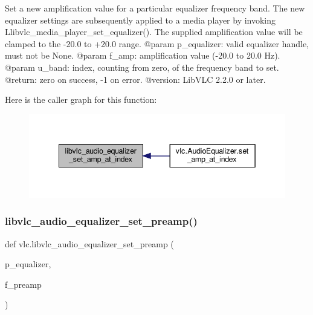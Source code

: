 \begin{DoxyVerb}Set a new amplification value for a particular equalizer frequency band.
The new equalizer settings are subsequently applied to a media player by invoking
L{libvlc_media_player_set_equalizer}().
The supplied amplification value will be clamped to the -20.0 to +20.0 range.
@param p_equalizer: valid equalizer handle, must not be None.
@param f_amp: amplification value (-20.0 to 20.0 Hz).
@param u_band: index, counting from zero, of the frequency band to set.
@return: zero on success, -1 on error.
@version: LibVLC 2.2.0 or later.
\end{DoxyVerb}
 Here is the caller graph for this function\+:
\nopagebreak
\begin{figure}[H]
\begin{center}
\leavevmode
\includegraphics[width=342pt]{namespacevlc_afa112c9fa2e01582526543f4cc824132_icgraph}
\end{center}
\end{figure}
\mbox{\label{namespacevlc_a10afe2e2760d5e0929afd7544bd08fc7}} 
\subsubsection{\texorpdfstring{libvlc\+\_\+audio\+\_\+equalizer\+\_\+set\+\_\+preamp()}{libvlc\_audio\_equalizer\_set\_preamp()}}
{\footnotesize\ttfamily def vlc.\+libvlc\+\_\+audio\+\_\+equalizer\+\_\+set\+\_\+preamp (\begin{DoxyParamCaption}\item[{}]{p\+\_\+equalizer,  }\item[{}]{f\+\_\+preamp }\end{DoxyParamCaption})}

